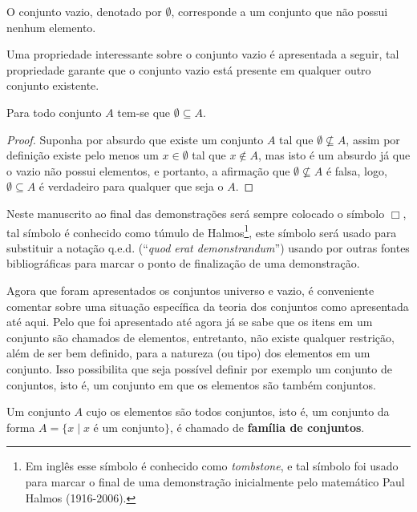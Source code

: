 \begin{definition}\label{def:ConjuntoVazio}
	O conjunto vazio, denotado por $\emptyset$, corresponde a um conjunto que não possui nenhum elemento.
\end{definition} 

Uma propriedade interessante sobre o conjunto vazio é apresentada a seguir, tal propriedade garante que o conjunto vazio está presente em qualquer outro conjunto existente.

\begin{theorem}\label{teo:ConjuntoVazioSubDeTodos}
	Para todo conjunto $A$ tem-se que $\emptyset \subseteq A$.
\end{theorem}

\begin{proof}
	Suponha por absurdo que existe um conjunto $A$ tal que $\emptyset \not\subseteq A$, assim por definição  existe pelo menos um $x \in \emptyset$ tal que $x \notin A$, mas isto é um absurdo já que o vazio não possui elementos, e portanto, a afirmação que $\emptyset \not\subseteq A$ é falsa, logo, $\emptyset \subseteq A$ é verdadeiro para qualquer que seja o $A$.
\end{proof}

\begin{note}
	Neste manuscrito ao final das demonstrações será sempre colocado o símbolo $\Box$, tal símbolo é conhecido como túmulo de Halmos\footnote{Em inglês esse símbolo é conhecido como \textit{tombstone}, e tal símbolo foi usado para marcar o final de uma demonstração inicialmente pelo matemático Paul Halmos (1916-2006).}, este símbolo será usado para substituir a notação q.e.d. (``\textit{quod erat demonstrandum}'') usando por outras fontes bibliográficas para marcar o ponto de finalização de uma demonstração. 
\end{note}

Agora que foram apresentados os conjuntos universo e vazio, é conveniente comentar sobre uma situação específica da teoria dos conjuntos como apresentada até aqui. Pelo que foi apresentado até agora já se sabe que os itens em um conjunto são chamados de elementos, entretanto, não existe qualquer restrição, além de ser bem definido, para a natureza (ou tipo) dos elementos em um conjunto. Isso possibilita que seja possível definir por exemplo um conjunto de conjuntos, isto é, um conjunto em que os elementos são também conjuntos.

\begin{definition}\label{def:Familia}
	Um conjunto $A$ cujo os elementos são todos conjuntos, isto é, um conjunto da forma $A = \{x \mid x \mbox{ é um conjunto}\}$, é chamado de \textbf{família de conjuntos}.
\end{definition}

